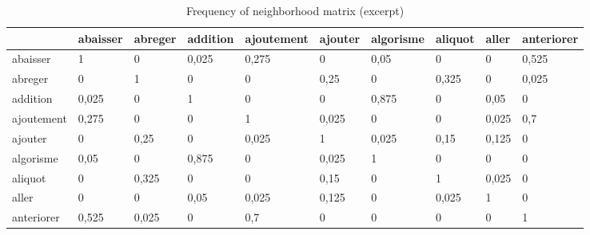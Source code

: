 \documentclass[preprint]{elsarticle}
\begin{document}
\begin{table}
\begin{small}
\begin{tabular}{|l|l|l|l|l|l|l|l|l|l|}
\hline
 & abaisser & abreger & addition & ajoutement & ajouter & algorisme & aliquot & aller & anteriorer \\ \hline
abaisser  & \cellcolor{gris} 1 & 0 & \cellcolor{grisclair} 0,025 & \cellcolor{gris} 0,275 & 0 & \cellcolor{grisclair} 0,05 & 0 & 0 & \cellcolor{gris} 0,525\\ \hline
abreger & 0 & \cellcolor{gris} 1 & 0 & 0 & \cellcolor{gris} 0,25 & 0 & \cellcolor{gris} 0,325 & 0 & \cellcolor{grisclair} 0,025\\ \hline
addition & \cellcolor{grisclair} 0,025 & 0 & \cellcolor{gris} 1 & 0 & 0 & \cellcolor{gris} 0,875 & 0 & \cellcolor{grisclair} 0,05 & 0\\ \hline
ajoutement  & \cellcolor{gris} 0,275 & 0 & 0 & \cellcolor{gris} 1 & \cellcolor{grisclair} 0,025 & 0 & 0 & \cellcolor{grisclair} 0,025 & \cellcolor{gris} 0,7\\ \hline
ajouter & 0 & \cellcolor{gris} 0,25 & 0 & \cellcolor{grisclair} 0,025 & \cellcolor{gris} 1 & \cellcolor{grisclair} 0,025 & \cellcolor{grisclair} 0,15 & \cellcolor{grisclair} 0,125 & 0\\ \hline
algorisme & \cellcolor{grisclair} 0,05 & 0 & \cellcolor{gris} 0,875 & 0 & \cellcolor{grisclair} 0,025 & \cellcolor{gris} 1 & 0 & 0 & 0\\ \hline
aliquot & 0 & \cellcolor{gris} 0,325 & 0 & 0 & \cellcolor{grisclair} 0,15 & 0 & \cellcolor{gris} 1 & \cellcolor{grisclair} 0,025 & 0\\ \hline
aller & 0 & 0 & \cellcolor{grisclair} 0,05 & \cellcolor{grisclair} 0,025 & \cellcolor{grisclair} 0,125 & 0 & \cellcolor{grisclair} 0,025 & \cellcolor{gris} 1 & 0\\ \hline
anteriorer & \cellcolor{gris} 0,525 & \cellcolor{grisclair} 0,025 & 0 & \cellcolor{gris} 0,7 & 0 & 0 & 0 & 0 & \cellcolor{gris} 1 \\ \hline
\end{tabular}
\end{small}
\caption{Frequency of neighborhood matrix (excerpt)}
\label{bertin1}
\end{table}
\end{document}
